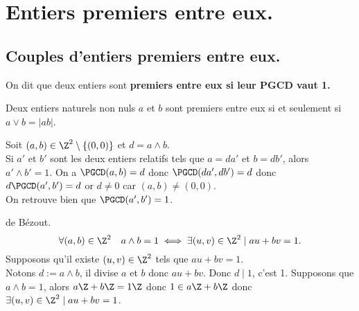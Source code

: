 \documentclass[11pt]{article}
\begin{document}
\section{Entiers premiers entre eux.}
\subsection{Couples d'entiers premiers entre eux.}

\begin{defi}{}{}
    On dit que deux entiers sont \bf{premiers entre eux} si leur PGCD vaut 1.
\end{defi}

\begin{prop}{}{}
    Deux entiers naturels non nuls $a$ et $b$ sont premiers entre eux si et seulement si $a\lor b=|ab|$.
\end{prop}

\begin{prop}{}{}
    Soit $(a,b)\in\Z^2\setminus\{(0,0)\}$ et $d=a\land b$.\\
    Si $a'$ et $b'$ sont les deux entiers relatifs tels que $a=da'$ et $b=db'$, alors $a'\land b'=1$.
    \tcblower
    On a $\PGCD(a,b)=d$ donc $\PGCD(da',db')=d$ donc $d\PGCD(a',b')=d$ or $d\neq0$ car $(a,b)\neq(0,0)$.\\
    On retrouve bien que $\PGCD(a',b')=1$.
\end{prop}

\begin{thm}{de Bézout.}{}
    \begin{equation*}
        \forall(a,b)\in\Z^2\quad a\land b = 1 \iff \exists(u,v)\in\Z^2\mid au+bv=1.
    \end{equation*}
    \tcblower
    \fbox{$\la$} Supposons qu'il existe $(u,v)\in\Z^2$ tels que $au+bv=1$.\\
    Notons $d:=a\land b$, il divise $a$ et $b$ donc $au+bv$. Donc $d\mid 1$, c'est 1.\n
    \fbox{$\ra$} Supposons que $a\land b = 1$, alors $a\Z+b\Z=1\Z$ donc $1\in a\Z+b\Z$ donc $\exists (u,v)\in\Z^2\mid au+bv=1$.
\end{thm}
\end{document}
